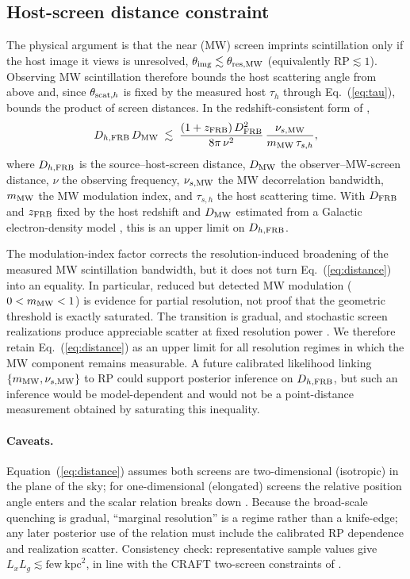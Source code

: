 \subsection{Host-screen distance constraint}
\label{app:distance}

The physical argument \citep{Masui2015,CordesChatterjee2019} is that the near
(MW) screen imprints scintillation only if the host image it views is
unresolved, $\theta_{\rm img}\lesssim\theta_{\rm res,MW}$ (equivalently
$\mathrm{RP}\lesssim1$). Observing MW scintillation therefore bounds the host
scattering angle from above and, since $\theta_{{\rm scat},h}$ is fixed by the
measured host $\tau_{h}$ through Eq.~(\ref{eq:tau}), bounds the product of
screen distances. In the redshift-consistent form of \citet{Pradeep2025},
%
\begin{equation}
D_{h,\rm FRB}\,D_{\rm MW}
  \;\lesssim\;
  \frac{(1+z_{\rm FRB})\,D_{\rm FRB}^{2}}{8\pi\,\nu^{2}}\,
  \frac{\nu_{s,\rm MW}}{m_{\rm MW}\,\tau_{s,h}},
\label{eq:distance}
\end{equation}
%
where $D_{h,\rm FRB}$ is the source--host-screen distance, $D_{\rm MW}$ the
observer--MW-screen distance, $\nu$ the observing frequency, $\nu_{s,\rm MW}$
the MW decorrelation bandwidth, $m_{\rm MW}$ the MW modulation index, and
$\tau_{s,h}$ the host scattering time. With $D_{\rm FRB}$ and $z_{\rm FRB}$
fixed by the host redshift and $D_{\rm MW}$ estimated from a Galactic
electron-density model \citep{CordesLazio2002}, this is an upper limit on
$D_{h,\rm FRB}$.

The modulation-index factor corrects the resolution-induced broadening of the
measured MW scintillation bandwidth, but it does not turn
Eq.~(\ref{eq:distance}) into an equality. In particular, reduced but detected
MW modulation ($0<m_{\rm MW}<1$) is evidence for partial resolution, not proof
that the geometric threshold is exactly saturated. The transition is gradual,
and stochastic screen realizations produce appreciable scatter at fixed
resolution power \citep{Pradeep2025}. We therefore retain
Eq.~(\ref{eq:distance}) as an upper limit for all resolution regimes in which
the MW component remains measurable. A future calibrated likelihood linking
$\{m_{\rm MW},\nu_{s,\rm MW}\}$ to RP could support posterior inference on
$D_{h,\rm FRB}$, but such an inference would be model-dependent and would not
be a point-distance measurement obtained by saturating this inequality.

\paragraph{Caveats.} Equation~(\ref{eq:distance}) assumes both screens are
two-dimensional (isotropic) in the plane of the sky; for
one-dimensional (elongated) screens the relative position angle enters and the
scalar relation breaks down \citep{Pradeep2025}. Because the broad-scale
quenching is gradual, ``marginal resolution'' is a regime rather than a
knife-edge; any later posterior use of the relation must include the calibrated
RP dependence and realization scatter. Consistency check:
representative sample values give $L_{x}L_{g}\lesssim\text{few}\
\mathrm{kpc}^{2}$, in line with the CRAFT two-screen constraints of
\citet{Sammons2023}.

